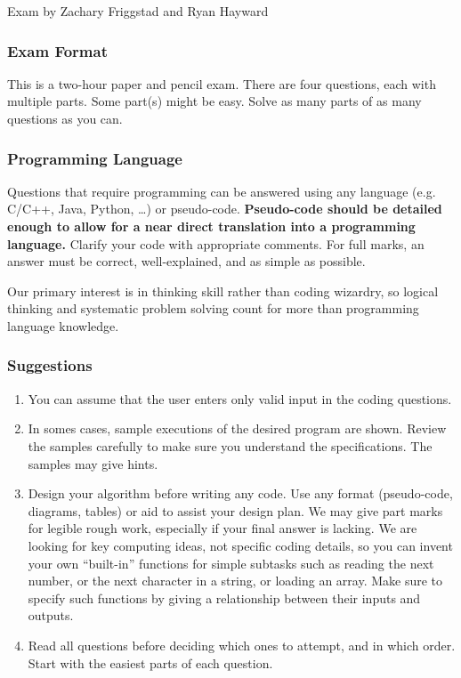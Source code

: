 \documentclass[12pt]{article}
\begin{document}
\vfill
\hfill{\small Exam by Zachary Friggstad and Ryan Hayward}\hfill~
\newpage
\subsubsection*{Exam Format}

This is a two-hour paper and pencil exam. 
There are four questions, each with multiple parts.
Some part(s) might be easy.
Solve as many parts of as many questions as you can.  

\subsubsection*{Programming Language}

Questions that require programming can be answered
using any language (e.g.~ C/C++, Java, Python, \ldots) or pseudo-code. 
{\bf Pseudo-code should be detailed enough to
  allow for a near direct translation into a programming
  language.}
Clarify your code with appropriate comments.
For full marks, an answer must be correct, 
well-explained, and as simple as possible.

Our primary interest is in thinking skill rather 
than coding wizardry, so logical thinking 
and systematic problem solving count for more than 
programming language knowledge.

\subsubsection*{Suggestions}
\begin{enumerate}
\item You can assume that the user enters only valid input in the coding questions.
\item In somes cases, sample executions of the desired program are shown.
Review the samples carefully to make sure you understand 
the specifications. The samples may give hints. 
\item Design your algorithm before writing any code.
  Use any format (pseudo-code, diagrams, tables) or aid 
  to assist your design plan. 
  We may give part marks for legible rough work,
  especially if your final answer is lacking.
  We are looking for key computing ideas, not specific coding details, 
  so you can invent your own ``built-in'' 
  functions for simple subtasks such as reading
  the next number, or the next character in a string, or loading an
  array.  Make sure to specify such functions by giving a 
  relationship between their inputs and outputs. 
\item Read all questions before deciding which ones
  to attempt, and in which order.  Start with the easiest parts of
  each question.  
\end{enumerate}
\end{document}
